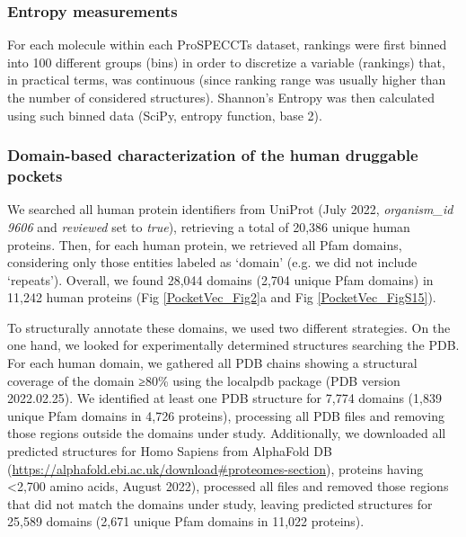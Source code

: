 \subsubsection{Entropy measurements}

For each molecule within each ProSPECCTs dataset, rankings were first binned into 100 different groups (bins) in order to discretize a variable (rankings) that, in practical terms, was continuous (since ranking range was usually higher than the number of considered structures). Shannon's Entropy was then calculated using such binned data (SciPy\cite{virtanen_scipy_2020}, entropy function, base 2).

\subsubsection{Domain-based characterization of the human druggable pockets}

We searched all human protein identifiers from UniProt (July 2022, \textit{organism\_id 9606} and \textit{reviewed} set to \textit{true}), retrieving a total of 20,386 unique human proteins\cite{the_uniprot_consortium_uniprot_2023}. Then, for each human protein, we retrieved all Pfam domains\cite{mistry_pfam_2021}, considering only those entities labeled as ‘domain’ (e.g. we did not include ‘repeats’). Overall, we found 28,044 domains (2,704 unique Pfam domains) in 11,242 human proteins (Fig \ref{PocketVec_Fig2}a and Fig \ref{PocketVec_FigS15}).

To structurally annotate these domains, we used two different strategies. On the one hand, we looked for experimentally determined structures searching the PDB\cite{goodsell_rcsb_2020}. For each human domain, we gathered all PDB chains showing a structural coverage of the domain ≥80\% using the localpdb package\cite{ludwiczak_localpdb_2022} (PDB version 2022.02.25). We identified at least one PDB structure for 7,774 domains (1,839 unique Pfam domains in 4,726 proteins), processing all PDB files and removing those regions outside the domains under study. Additionally, we downloaded all predicted structures for Homo Sapiens from AlphaFold DB (\href{https://alphafold.ebi.ac.uk/download\#proteomes-section}{https://alphafold.ebi.ac.uk/download\#proteomes-section}), proteins having <2,700 amino acids, August 2022), processed all files and removed those regions that did not match the domains under study, leaving predicted structures for 25,589 domains (2,671 unique Pfam domains in 11,022 proteins).


